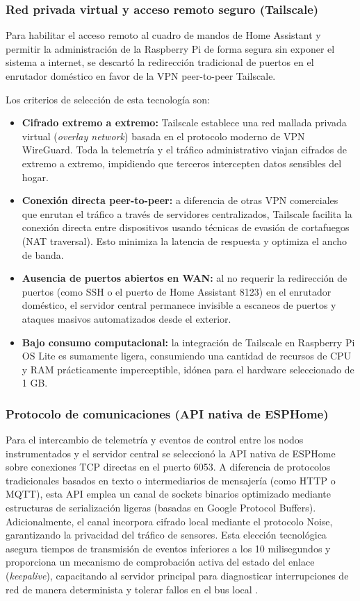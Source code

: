 \subsubsection{Red privada virtual y acceso remoto seguro (Tailscale)}
Para habilitar el acceso remoto al cuadro de mandos de Home Assistant y permitir la administración de la Raspberry Pi de forma segura sin exponer el sistema a internet, se descartó la redirección tradicional de puertos en el enrutador doméstico en favor de la VPN peer-to-peer Tailscale.

Los criterios de selección de esta tecnología son:
\begin{itemize}
    \item \textbf{Cifrado extremo a extremo:} Tailscale establece una red mallada privada virtual (\textit{overlay network}) basada en el protocolo moderno de VPN WireGuard. Toda la telemetría y el tráfico administrativo viajan cifrados de extremo a extremo, impidiendo que terceros intercepten datos sensibles del hogar.
    \item \textbf{Conexión directa peer-to-peer:} a diferencia de otras VPN comerciales que enrutan el tráfico a través de servidores centralizados, Tailscale facilita la conexión directa entre dispositivos usando técnicas de evasión de cortafuegos (NAT traversal). Esto minimiza la latencia de respuesta y optimiza el ancho de banda.
    \item \textbf{Ausencia de puertos abiertos en WAN:} al no requerir la redirección de puertos (como SSH o el puerto de Home Assistant 8123) en el enrutador doméstico, el servidor central permanece invisible a escaneos de puertos y ataques masivos automatizados desde el exterior.
    \item \textbf{Bajo consumo computacional:} la integración de Tailscale en Raspberry Pi OS Lite es sumamente ligera, consumiendo una cantidad de recursos de CPU y RAM prácticamente imperceptible, idónea para el hardware seleccionado de 1 GB.
\end{itemize}

\subsubsection{Protocolo de comunicaciones (API nativa de ESPHome)}
Para el intercambio de telemetría y eventos de control entre los nodos instrumentados y el servidor central se seleccionó la API nativa de ESPHome sobre conexiones TCP directas en el puerto 6053. A diferencia de protocolos tradicionales basados en texto o intermediarios de mensajería (como HTTP o MQTT), esta API emplea un canal de sockets binarios optimizado mediante estructuras de serialización ligeras (basadas en Google Protocol Buffers). Adicionalmente, el canal incorpora cifrado local mediante el protocolo Noise, garantizando la privacidad del tráfico de sensores. Esta elección tecnológica asegura tiempos de transmisión de eventos inferiores a los 10 milisegundos y proporciona un mecanismo de comprobación activa del estado del enlace (\textit{keepalive}), capacitando al servidor principal para diagnosticar interrupciones de red de manera determinista y tolerar fallos en el bus local \cite{al2015internet}.

